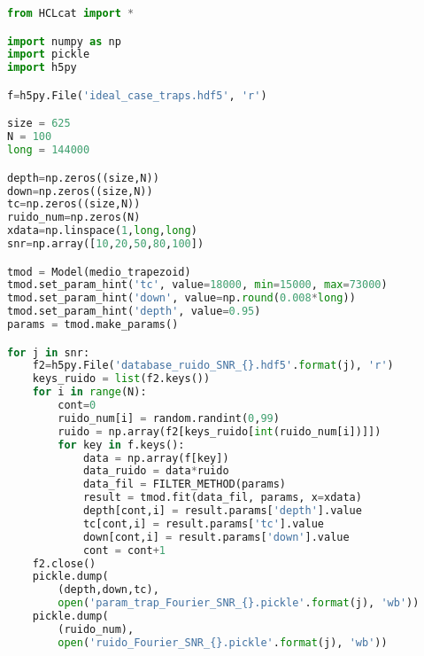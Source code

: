 \begin{lstlisting}[language=Python]
from HCLcat import *

import numpy as np
import pickle
import h5py

f=h5py.File('ideal_case_traps.hdf5', 'r')

size = 625 
N = 100
long = 144000

depth=np.zeros((size,N))
down=np.zeros((size,N))
tc=np.zeros((size,N))
ruido_num=np.zeros(N)
xdata=np.linspace(1,long,long)
snr=np.array([10,20,50,80,100])

tmod = Model(medio_trapezoid)
tmod.set_param_hint('tc', value=18000, min=15000, max=73000)
tmod.set_param_hint('down', value=np.round(0.008*long))
tmod.set_param_hint('depth', value=0.95)
params = tmod.make_params()

for j in snr:
    f2=h5py.File('database_ruido_SNR_{}.hdf5'.format(j), 'r')
    keys_ruido = list(f2.keys())
    for i in range(N):
        cont=0
        ruido_num[i] = random.randint(0,99)
        ruido = np.array(f2[keys_ruido[int(ruido_num[i])]])
        for key in f.keys():
            data = np.array(f[key])
            data_ruido = data*ruido
            data_fil = FILTER_METHOD(params)
            result = tmod.fit(data_fil, params, x=xdata)       
            depth[cont,i] = result.params['depth'].value
            tc[cont,i] = result.params['tc'].value
            down[cont,i] = result.params['down'].value    
            cont = cont+1
    f2.close()
    pickle.dump(
		(depth,down,tc),
		open('param_trap_Fourier_SNR_{}.pickle'.format(j), 'wb'))
    pickle.dump(
		(ruido_num), 
		open('ruido_Fourier_SNR_{}.pickle'.format(j), 'wb'))

\end{lstlisting}
